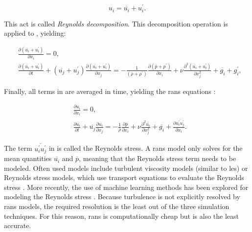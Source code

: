 \begin{equation}
    u_i = \overline{u_i} + u_i^\prime.
    \label{eq:reynolds_decomposition}
\end{equation}

This act is called \emph{Reynolds decomposition}. This decomposition operation is applied to , yielding:

\begin{align}
    &\frac{\partial \left( \overline{u_i} + u_i^\prime \right)}{\partial x_i} = 0, \label{eq:reynolds_mass}\\
    &\frac{\partial \left( \overline{u_i} + u_i^\prime \right)}{\partial t} + \left( \overline{u_j} + u_j^\prime \right) \frac{\partial \left( \overline{u_i} + u_i^\prime \right)}{\partial x_j} = - \frac{1}{\left( \overline{\rho} + \rho^\prime \right)} \frac{\partial \left( \overline{p} + p^\prime \right)}{\partial x_i} + \nu \frac{\partial^2 \left( \overline{u_i} + u_i^\prime \right)}{\partial x_j^2} + \overline{g_i} + g_i^\prime,
    \label{eq:reynolds_momentum}
\end{align}

Finally, all terms in  are averaged in time, yielding the \acrshort{rans} equations \citep[Chapter~4]{popeTurbulentFlows2000}:

\begin{align}
    &\frac{\partial \overline{u_i}}{\partial x_i} = 0, \label{eq:rans_mass}\\
    &\frac{\partial \overline{u_i}}{\partial t} + \overline{u_j} \frac{\partial \overline{u_i}}{\partial x_j} = - \frac{1}{\overline{\rho}} \frac{\partial \overline{p}}{\partial x_i} + \nu \frac{\partial^2 \overline{u_i}}{\partial x_j^2} + \overline{g_i} + \frac{\partial \overline{u_i^\prime u_j^\prime}}{\partial x_i}. \label{eq:rans_momentum}
\end{align}

The term $\overline{u_i^\prime u_j^\prime}$ in  is called the Reynolds stress. A \acrshort{rans} model only solves  for the mean quantities $\overline{u_i}$ and $\overline{p}$, meaning that the Reynolds stress term needs to be modeled. Often used models include turbulent viscosity models (similar to \acrshort{les}) or Reynolds stress models, which use transport equations to evaluate the Reynolds stress \citep{popeTurbulentFlows2000}. More recently, the use of machine learning methods has been explored for modeling the Reynolds stress \citep{bruntonMachineLearningFluid2020}. Because turbulence is not explicitly resolved by \acrshort{rans} models, the required resolution is the least out of the three simulation techniques. For this reason, \acrshort{rans} is computationally cheap but is also the least accurate. 


